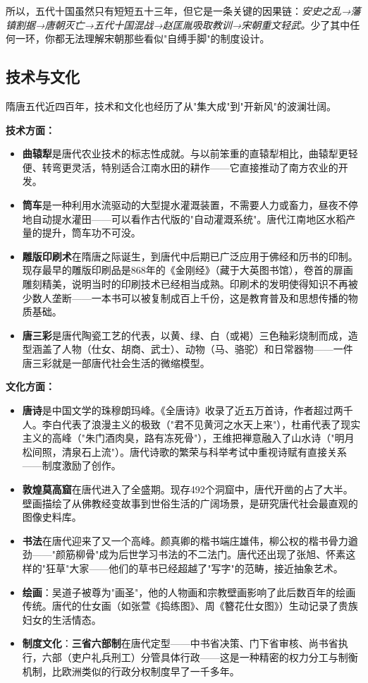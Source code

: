 \documentclass[a4paper,12pt]{ctexart}
\begin{document}
所以，五代十国虽然只有短短五十三年，但它是一条关键的因果链：\textit{安史之乱→藩镇割据→唐朝灭亡→五代十国混战→赵匡胤吸取教训→宋朝重文轻武。}少了其中任何一环，你都无法理解宋朝那些看似"自缚手脚"的制度设计。

\subsection*{技术与文化}

隋唐五代近四百年，技术和文化也经历了从"集大成"到"开新风"的波澜壮阔。

\textbf{技术方面：}
\begin{itemize}
  \item \textbf{曲辕犁}是唐代农业技术的标志性成就。与以前笨重的直辕犁相比，曲辕犁更轻便、转弯更灵活，特别适合江南水田的耕作——它直接推动了南方农业的开发。
  \item \textbf{筒车}是一种利用水流驱动的大型提水灌溉装置，不需要人力或畜力，昼夜不停地自动提水灌田——可以看作古代版的"自动灌溉系统"。唐代江南地区水稻产量的提升，筒车功不可没。
  \item \textbf{雕版印刷术}在隋唐之际诞生，到唐代中后期已广泛应用于佛经和历书的印制。现存最早的雕版印刷品是868年的《金刚经》（藏于大英图书馆），卷首的扉画雕刻精美，说明当时的印刷技术已经相当成熟。印刷术的发明使得知识不再被少数人垄断——一本书可以被复制成百上千份，这是教育普及和思想传播的物质基础。
  \item \textbf{唐三彩}是唐代陶瓷工艺的代表，以黄、绿、白（或褐）三色釉彩烧制而成，造型涵盖了人物（仕女、胡商、武士）、动物（马、骆驼）和日常器物——一件唐三彩就是一部唐代社会生活的微缩模型。
\end{itemize}

\textbf{文化方面：}
\begin{itemize}
  \item \textbf{唐诗}是中国文学的珠穆朗玛峰。《全唐诗》收录了近五万首诗，作者超过两千人。李白代表了浪漫主义的极致（"君不见黄河之水天上来"），杜甫代表了现实主义的高峰（"朱门酒肉臭，路有冻死骨"），王维把禅意融入了山水诗（"明月松间照，清泉石上流"）。唐代诗歌的繁荣与科举考试中重视诗赋有直接关系——制度激励了创作。
  \item \textbf{敦煌莫高窟}在唐代进入了全盛期。现存492个洞窟中，唐代开凿的占了大半。壁画描绘了从佛教经变故事到世俗生活的广阔场景，是研究唐代社会最直观的图像史料库。
  \item \textbf{书法}在唐代迎来了又一个高峰。颜真卿的楷书端庄雄伟，柳公权的楷书骨力遒劲——"颜筋柳骨"成为后世学习书法的不二法门。唐代还出现了张旭、怀素这样的"狂草"大家——他们的草书已经超越了"写字"的范畴，接近抽象艺术。
  \item \textbf{绘画}：吴道子被尊为"画圣"，他的人物画和宗教壁画影响了此后数百年的绘画传统。唐代的仕女画（如张萱《捣练图》、周《簪花仕女图》）生动记录了贵族妇女的生活情态。
  \item \textbf{制度文化}：\textbf{三省六部制}在唐代定型——中书省决策、门下省审核、尚书省执行，六部（吏户礼兵刑工）分管具体行政——这是一种精密的权力分工与制衡机制，比欧洲类似的行政分权制度早了一千多年。
\end{itemize}
\end{document}
